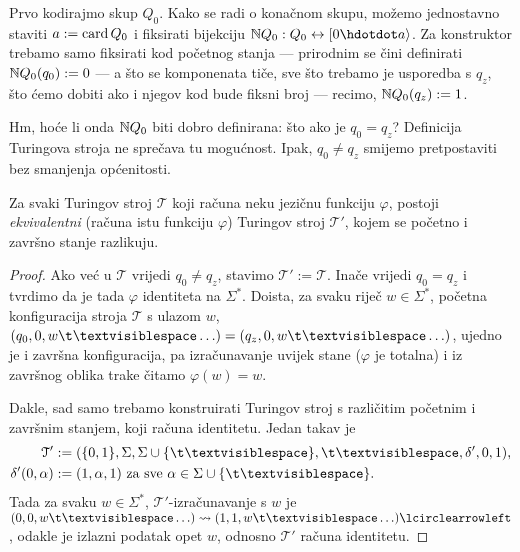 
Prvo kodirajmo skup $Q_0$. Kako se radi o konačnom skupu, možemo jednostavno staviti $a:=\operatorname{card} Q_0$ i fiksirati bijekciju $\N Q_0:Q_0\leftrightarrow[0\dd a\rangle$. Za konstruktor trebamo samo fiksirati kod početnog stanja --- prirodnim se čini definirati ${\mathbb N} Q_0(q_0):=0$ --- a što se komponenata tiče, sve što trebamo je usporedba s $q_z$, što ćemo dobiti ako i njegov kod bude fiksni broj --- recimo, ${\mathbb N} Q_0(q_z):=1$.

Hm, hoće li onda ${\mathbb N} Q_0$ biti dobro definirana: što ako je $q_0=q_z$? Definicija Turingova stroja ne sprečava tu mogućnost.
Ipak, $q_0\ne q_z$ smijemo pretpostaviti bez smanjenja općenitosti.

\begin{lema}[{name=[možemo pretpostaviti $q_0\ne q_z$]}]\label{lm:bsomp-q0neqz}
	Za svaki Turingov stroj $\mathcal T$ koji računa neku jezičnu funkciju $\varphi$, postoji \emph{ekvivalentni} (računa istu funkciju $\varphi$) Turingov stroj $\mathcal T'$, kojem se početno i završno stanje razlikuju.
\end{lema}
\begin{proof}
Ako već u $\mathcal T$ vrijedi $q_0\ne q_z$, stavimo $\mathcal T':=\mathcal T$. Inače vrijedi $q_0=q_z$ i tvrdimo da je tada $\varphi$ identiteta na $\Sigma^*$. Doista, za svaku riječ $w\in\Sigma^*$, početna konfiguracija stroja $\mathcal T$ s ulazom $w$, $(q_0,0,w\bl\ldots)=(q_z,0,w\bl\ldots)$, ujedno je i završna konfiguracija, pa izračunavanje uvijek stane ($\varphi$ je totalna) i iz završnog oblika trake čitamo $\varphi(w)=w$.

Dakle, sad samo trebamo konstruirati Turingov stroj s različitim početnim i za\-vrš\-nim stanjem, koji računa identitetu. Jedan takav je
\begin{align}
    \mathcal T'&:=(\{0,1\},\Sigma,\Sigma\cup\{\bl\},\bl,\delta',0,1)\text,\\
    \delta'(0,\alpha)&:=(1,\alpha,1)\text{ za sve $\alpha\in\Sigma\cup\{\bl\}$.}
\end{align}
Tada za svaku $w\in\Sigma^*$, $\mathcal T'$\!-izračunavanje s $w$ je $(0,0,w\bl\ldots)\leadsto(1,1,w\bl\ldots)\lcirclearrowleft$, odakle je izlazni podatak opet $w$, odnosno $\mathcal T'$ računa identitetu.
\end{proof}

